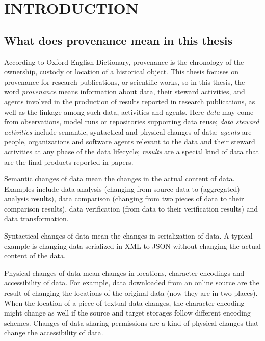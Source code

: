  
\chapter{INTRODUCTION}
\section{What does provenance mean in this thesis}
According to Oxford English Dictionary, provenance is the chronology of the ownership, custody or location of a historical object. This thesis focuses on provenance for research publications, or scientific works, so in this thesis, the word \emph{provenance} means information about data, their steward activities, and agents involved in the production of results reported in research publications, as well as the linkage among such data, activities and agents. Here \emph{data} may come from observations, model runs or repositories supporting data reuse; \emph{data steward activities} include semantic, syntactical and physical changes of data; \emph{agents} are people, organizations and software agents relevant to the data and their steward activities at any phase of the data lifecycle; \emph{results} are a special kind of data that are the final products reported in papers.

Semantic changes of data mean the changes in the actual content of data. Examples include data analysis (changing from source data to (aggregated) analysis results), data comparison (changing from two pieces of data to their comparison results), data verification (from data to their verification results) and data transformation. 

Syntactical changes of data mean the changes in serialization of data. A typical example is changing data serialized in XML to JSON without changing the actual content of the data.

Physical changes of data mean changes in locations, character encodings and accessibility of data. For example, data downloaded from an online source are the result of changing the locations of the original data (now they are in two places). When the location of a piece of textual data changes, the character encoding might change as well if the source and target storages follow different encoding schemes. Changes of data sharing permissions are a kind of physical changes that change the accessibility of data. 

